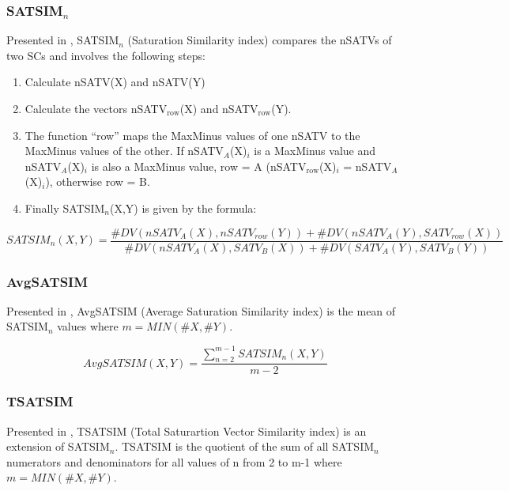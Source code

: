 \documentclass{article}
\begin{document}
\subsubsection{SATSIM$_{n}$}
\label{sec-15-9-2}

Presented in \citet[chap. 2.4]{Buchler1997}, SATSIM$_{n}$ (Saturation
Similarity index) compares the nSATVs of two SCs and involves the
following steps:
\begin{enumerate}
\item Calculate nSATV(X) and nSATV(Y)
\item Calculate the vectors nSATV$_{\mathrm{row}}$(X) and nSATV$_{\mathrm{row}}$(Y).
\item The function ``row'' maps the MaxMinus values of one nSATV to the
   MaxMinus values of the other. If nSATV$_{A}$(X)$_{i}$ is a MaxMinus
   value and nSATV$_{A}$(X)$_{i}$ is also a MaxMinus value, row = A
   (nSATV$_{\mathrm{row}}$(X)$_{i}$ = nSATV$_{A}$(X)$_{i}$), otherwise row = B.
\item Finally SATSIM$_{n}$(X,Y) is given by the formula:
\end{enumerate}

$$SATSIM_{n}(X,Y)=\frac{\#DV(nSATV_{A}(X),nSATV_{row}(Y))+\#DV(nSATV_{A}(Y),SATV_{row}(X))}{\#DV(nSATV_{A}(X),SATV_{B}(X))+\#DV(SATV_{A}(Y),SATV_{B}(Y))}$$
\subsubsection{AvgSATSIM}
\label{sec-15-9-3}

Presented in \citet[chap. 2.10]{Buchler1997}, AvgSATSIM (Average
Saturation Similarity index) is the mean of SATSIM$_{n}$ values where
$m=MIN(\#X,\#Y)$.

$$ AvgSATSIM(X,Y)=\frac{\sum_{n=2}^{m-1}{SATSIM_{n}(X,Y)}}{m-2}$$
\subsubsection{TSATSIM}
\label{sec-15-9-4}

Presented in \citet[chap. 2.10]{Buchler1997}, TSATSIM (Total
Saturartion Vector Similarity index) is an extension of
SATSIM$_{n}$. TSATSIM is the quotient of the sum of all SATSIM$_{n}$
numerators and denominators for all values of n from 2 to m-1 where
$m=MIN(\#X,\#Y)$.
\end{document}

